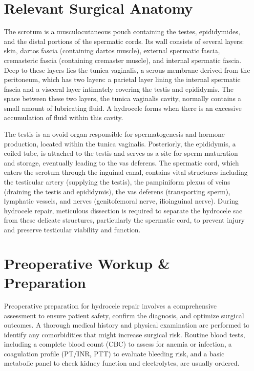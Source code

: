 \section*{Relevant Surgical Anatomy}
The scrotum is a musculocutaneous pouch containing the testes, epididymides, and the distal portions of the spermatic cords. Its wall consists of several layers: skin, dartos fascia (containing dartos muscle), external spermatic fascia, cremasteric fascia (containing cremaster muscle), and internal spermatic fascia. Deep to these layers lies the tunica vaginalis, a serous membrane derived from the peritoneum, which has two layers: a parietal layer lining the internal spermatic fascia and a visceral layer intimately covering the testis and epididymis. The space between these two layers, the tunica vaginalis cavity, normally contains a small amount of lubricating fluid. A hydrocele forms when there is an excessive accumulation of fluid within this cavity.

The testis is an ovoid organ responsible for spermatogenesis and hormone production, located within the tunica vaginalis. Posteriorly, the epididymis, a coiled tube, is attached to the testis and serves as a site for sperm maturation and storage, eventually leading to the vas deferens. The spermatic cord, which enters the scrotum through the inguinal canal, contains vital structures including the testicular artery (supplying the testis), the pampiniform plexus of veins (draining the testis and epididymis), the vas deferens (transporting sperm), lymphatic vessels, and nerves (genitofemoral nerve, ilioinguinal nerve). During hydrocele repair, meticulous dissection is required to separate the hydrocele sac from these delicate structures, particularly the spermatic cord, to prevent injury and preserve testicular viability and function.

\section*{Preoperative Workup \& Preparation}
Preoperative preparation for hydrocele repair involves a comprehensive assessment to ensure patient safety, confirm the diagnosis, and optimize surgical outcomes. A thorough medical history and physical examination are performed to identify any comorbidities that might increase surgical risk. Routine blood tests, including a complete blood count (CBC) to assess for anemia or infection, a coagulation profile (PT/INR, PTT) to evaluate bleeding risk, and a basic metabolic panel to check kidney function and electrolytes, are usually ordered.

